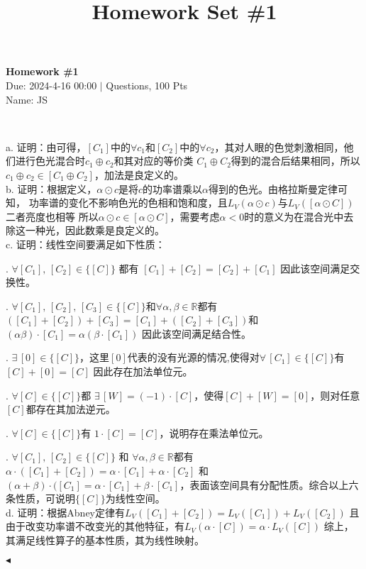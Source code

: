 \documentclass[11pt]{article}
\title{Homework Set \#1}
\newcommand{\rmnum}[1]{\romannumeral #1}
\newenvironment{question}[2][Question]{\begin{trivlist}
\item[\hskip \labelsep {\bfseries #1}\hskip \labelsep {\bfseries #2.}]}{\hfill$\blacktriangleleft$\end{trivlist}}
\begin{document}
    \pagestyle{fancy}
    \lhead{}
    \chead{}

    \begin{center}
        {\LARGE \bf Homework \#1}\\
        {Due: 2024-4-16 00:00 \quad$|$ Questions, 100 Pts}\\
        {Name: JS}
    \end{center}

    \begin{question}{1 (16') (向量空间)}~

    a. 证明：由\rmnum{2}可得，$[C_1]$中的$\forall c_1$和$[C_2]$中的$\forall c_2$，其对人眼的色觉刺激相同，他们进行色光混合时$c_1 \oplus c_2$和其对应的等价类
    $C_1 \oplus C_2$得到的混合后结果相同，所以$c_1 \oplus c_2 \in [C_1 \oplus C_2]$，加法是良定义的。
    ~\\

    
    b. 证明：根据定义，$\alpha \odot c$是将$c$的功率谱乘以$\alpha$得到的色光。由格拉斯曼定律\rmnum{3}可知，
    功率谱的变化不影响色光的色相和饱和度，且$L_V(\alpha \odot c)$与$L_V([\alpha \odot C])$二者亮度也相等
    所以$\alpha \odot c \in [\alpha \odot C]$，需要考虑$\alpha < 0$时的意义为在混合光中去除这一种光，因此数乘是良定义的。
    ~\\

    c. 证明：线性空间要满足如下性质：

    .  $\forall [C_1],\, [C_2] \in \{[C]\}$ 都有 $[C_1] + [C_2] = [C_2] + [C_1]$ 因此该空间满足交换性。

    .  $\forall [C_1], \,[C_2],\, [C_3] \in \{[C]\}$和$\forall \alpha,  \beta \in \mathbb{R}$都有 $([C_1] + [C_2]) + [C_3] = [C_1] + ([C_2] + [C_3])$和
    $(\alpha \beta) \cdot [C_1] = \alpha (\beta \cdot [C_1])$ 因此该空间满足结合性。

    .  $\exists \, [0] \in \{[C]\}$，这里$[0]$代表的没有光源的情况,使得对$\forall \, [C_1] \in \{[C]\}$有$[C] + [0] = [C]$ 因此存在加法单位元。

    .  $\forall [C] \in \{[C]\}$都 $\exists \, [W] = (-1) \cdot [C]$，使得$[C] + [W] = [0]$，则对任意$[C]$都存在其加法逆元。

    .  $\forall [C] \in \{[C]\}$有 $1 \cdot [C] = [C]$，说明存在乘法单位元。

    .  $\forall [C_1], \,[C_2] \in \{[C]\}$ 和 $\forall \alpha,  \beta \in \mathbb{R}$都有$\alpha \cdot ([C_1] + [C_2]) = \alpha \cdot [C_1] + \alpha \cdot [C_2]$
    和$(\alpha + \beta) \cdot ([C_1] = \alpha \cdot [C_1] + \beta \cdot [C_1]$，表面该空间具有分配性质。综合以上六条性质，可说明$\{[C]\}$为线性空间。
    ~\\

    d. 证明：根据Abney定律有$L_V([C_1] + [C_2]) = L_V([C_1]) + L_V([C_2])$ 且由于改变功率谱不改变光的其他特征，有$L_V(\alpha \cdot [C]) = \alpha \cdot L_V([C])$
    综上，其满足线性算子的基本性质，其为线性映射。
    
    \end{question}
\end{document}
